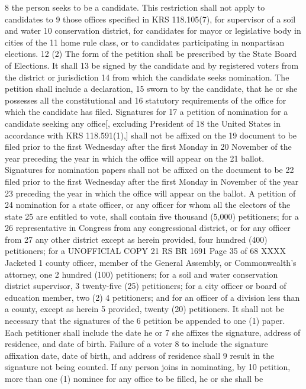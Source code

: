 8 the person seeks to be a candidate. This restriction shall not apply to candidates to
9 those offices specified in KRS 118.105(7), for supervisor of a soil and water
10 conservation district, for candidates for mayor or legislative body in cities of the
11 home rule class, or to candidates participating in nonpartisan elections.
12 (2) The form of the petition shall be prescribed by the State Board of Elections. It shall
13 be signed by the candidate and by registered voters from the district or jurisdiction
14 from which the candidate seeks nomination. The petition shall include a declaration,
15 sworn to by the candidate, that he or she possesses all the constitutional and
16 statutory requirements of the office for which the candidate has filed. Signatures for
17 a petition of nomination for a candidate seeking any office[, excluding President of
18 the United States in accordance with KRS 118.591(1),] shall not be affixed on the
19 document to be filed prior to the first Wednesday after the first Monday in
20 November of the year preceding the year in which the office will appear on the
21 ballot. Signatures for nomination papers shall not be affixed on the document to be
22 filed prior to the first Wednesday after the first Monday in November of the year
23 preceding the year in which the office will appear on the ballot. A petition of
24 nomination for a state officer, or any officer for whom all the electors of the state
25 are entitled to vote, shall contain five thousand (5,000) petitioners; for a
26 representative in Congress from any congressional district, or for any officer from
27 any other district except as herein provided, four hundred (400) petitioners; for a 
UNOFFICIAL COPY 21 RS BR 1691
Page 35 of 68
XXXX Jacketed
1 county officer, member of the General Assembly, or Commonwealth's attorney, one
2 hundred (100) petitioners; for a soil and water conservation district supervisor,
3 twenty-five (25) petitioners; for a city officer or board of education member, two (2)
4 petitioners; and for an officer of a division less than a county, except as herein
5 provided, twenty (20) petitioners. It shall not be necessary that the signatures of the
6 petition be appended to one (1) paper. Each petitioner shall include the date he or
7 she affixes the signature, address of residence, and date of birth. Failure of a voter
8 to include the signature affixation date, date of birth, and address of residence shall
9 result in the signature not being counted. If any person joins in nominating, by
10 petition, more than one (1) nominee for any office to be filled, he or she shall be
